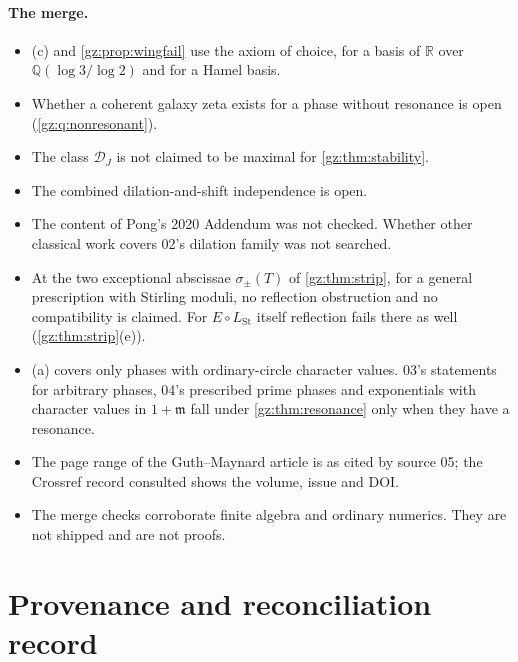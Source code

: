 \documentclass[11pt,a4paper]{article}
\numberwithin{equation}{section}
\theoremstyle{definition}
\theoremstyle{remark}
\newcommand{\R}{\mathbb R}
\newcommand{\Q}{\mathbb Q}
\newcommand{\mm}{\mathfrak m}
\newcommand{\LSt}{L_{\mathrm{St}}}
\newcommand{\DJs}{\mathcal D_{J}}
\begin{document}
\paragraph{The merge.}
\begin{itemize}
\item {}(c) and \cref{gz:prop:wingfail} use the axiom of
 choice, for a basis of $\R$ over $\Q(\log3/\log2)$ and for a Hamel basis.
\item Whether a coherent galaxy zeta exists for a phase without resonance is
 open (\cref{gz:q:nonresonant}).
\item The class $\DJs$ is not claimed to be maximal for \cref{gz:thm:stability}.
\item The combined dilation-and-shift independence is open.
\item The content of Pong's 2020 Addendum \cite{PongAdd} was not checked.
 Whether other classical work covers 02's dilation family was not searched.
\item At the two exceptional abscissae $\sigma_\pm(T)$ of \cref{gz:thm:strip},
 for a general prescription with Stirling moduli, no reflection obstruction
 and no compatibility is claimed. For $E\circ\LSt$ itself reflection fails
 there as well (\cref{gz:thm:strip}(e)).
\item {}(a) covers only phases with ordinary-circle
 character values. 03's statements for arbitrary phases, 04's prescribed
 prime phases and exponentials with character values in $1+\mm$ fall under
 \cref{gz:thm:resonance} only when they have a resonance.
\item The page range of the Guth--Maynard article is as cited by source 05; the
 Crossref record consulted shows the volume, issue and DOI.
\item The merge checks corroborate finite algebra and ordinary numerics. They
 are not shipped and are not proofs.
\end{itemize}

\appendix
{}

\section{Provenance and reconciliation record}\label{gz:app:provenance}
\end{document}
